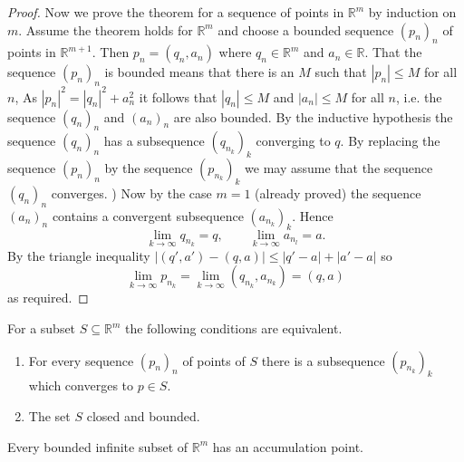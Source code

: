\documentclass[10pt,a4paper,UTF8]{article}
\begin{document}
\begin{proof}
Now we prove the theorem for a sequence of points in \(\mathbb{R}^m\) by induction on \(m\).
Assume the theorem holds for \(\mathbb{R}^m\) and choose a bounded sequence \((p_n)_n\) of points
in \(\mathbb{R}^{m+1}\). Then \(p_n=(q_n,a_n)\) where \(q_n\in\mathbb{R}^m\) and \(a_n\in\mathbb{R}\). That the sequence \((p_n)_n\) is bounded
means that there is an \(M\) such that \(|p_n|\le M\) for all \(n\),
As \(|p_n|^2=|q_n|^2+a_n^2\) it follows that \(|q_n|\le M\) and \(|a_n|\le M\) for all \(n\), i.e. the
sequence \((q_n)_n\) and \((a_n)_n\) are also bounded. By the inductive hypothesis the sequence \((q_n)_n\)
has a subsequence \((q_{n_k})_k\) converging to \(q\). By replacing the sequence \((p_n)_n\) by the sequence \((p_{n_k})_k\)
we may assume that the sequence \((q_n)_n\) converges. )
Now by the case \(m=1\) (already proved) the sequence \((a_n)_n\) contains
a convergent subsequence \((a_{n_k})_k\). Hence
\begin{equation*}
    \lim_{k\to\infty} q_{n_k}=q, \qquad \lim_{k\to\infty} a_{n_l}=a.
\end{equation*}
By the triangle inequality \(|(q',a')-(q,a)|\le|q'-a|+|a'-a|\) so
\begin{equation*}
    \lim_{k\to\infty}p_{n_k}=\lim_{k\to\infty}(q_{n_k},a_{n_k})= (q,a)
\end{equation*}
as required.
\end{proof}

\begin{corollary}
For a subset \(S\subseteq\mathbb{R}^m\) the following conditions are equivalent.

\begin{enumerate}
\item For every sequence \((p_n)_n\) of points of \(S\) there is a subsequence \((p_{n_k})_k\) which converges to \(p\in S\).
\item The set \(S\)  closed and bounded.
\end{enumerate}
\end{corollary}

\begin{corollary}
Every bounded infinite subset of \(\mathbb{R}^m\) has an accumulation point.
\end{corollary}


\end{document}
